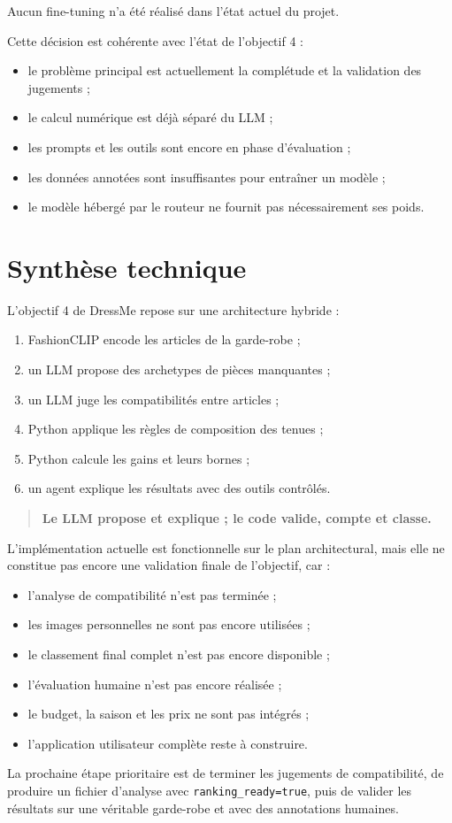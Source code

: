 \documentclass[11pt,a4paper]{article}
\begin{document}
Aucun fine-tuning n'a été réalisé dans l'état actuel du projet.

Cette décision est cohérente avec l'état de l'objectif 4 :

\begin{itemize}[leftmargin=*]
    \item le problème principal est actuellement la complétude et la
    validation des jugements ;
    \item le calcul numérique est déjà séparé du LLM ;
    \item les prompts et les outils sont encore en phase d'évaluation ;
    \item les données annotées sont insuffisantes pour entraîner un modèle ;
    \item le modèle hébergé par le routeur ne fournit pas nécessairement ses
    poids.
\end{itemize}

\section{Synthèse technique}

L'objectif 4 de DressMe repose sur une architecture hybride :

\begin{enumerate}[leftmargin=*]
    \item FashionCLIP encode les articles de la garde-robe ;
    \item un LLM propose des archetypes de pièces manquantes ;
    \item un LLM juge les compatibilités entre articles ;
    \item Python applique les règles de composition des tenues ;
    \item Python calcule les gains et leurs bornes ;
    \item un agent explique les résultats avec des outils contrôlés.
\end{enumerate}

\begin{quote}
\textbf{Le LLM propose et explique ; le code valide, compte et classe.}
\end{quote}

L'implémentation actuelle est fonctionnelle sur le plan architectural, mais
elle ne constitue pas encore une validation finale de l'objectif, car :

\begin{itemize}[leftmargin=*]
    \item l'analyse de compatibilité n'est pas terminée ;
    \item les images personnelles ne sont pas encore utilisées ;
    \item le classement final complet n'est pas encore disponible ;
    \item l'évaluation humaine n'est pas encore réalisée ;
    \item le budget, la saison et les prix ne sont pas intégrés ;
    \item l'application utilisateur complète reste à construire.
\end{itemize}

La prochaine étape prioritaire est de terminer les jugements de compatibilité,
de produire un fichier d'analyse avec \texttt{ranking\_ready=true}, puis de
valider les résultats sur une véritable garde-robe et avec des annotations
humaines.
\end{document}
